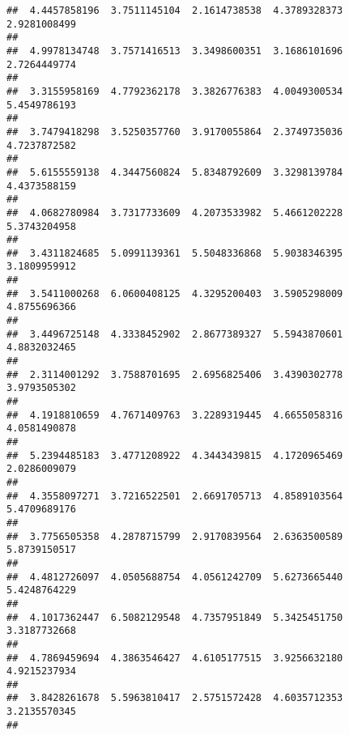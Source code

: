 \documentclass[]{article}
\begin{document}
\begin{verbatim}
##  4.4457858196  3.7511145104  2.1614738538  4.3789328373  2.9281008499 
##                                                                       
##  4.9978134748  3.7571416513  3.3498600351  3.1686101696  2.7264449774 
##                                                                       
##  3.3155958169  4.7792362178  3.3826776383  4.0049300534  5.4549786193 
##                                                                       
##  3.7479418298  3.5250357760  3.9170055864  2.3749735036  4.7237872582 
##                                                                       
##  5.6155559138  4.3447560824  5.8348792609  3.3298139784  4.4373588159 
##                                                                       
##  4.0682780984  3.7317733609  4.2073533982  5.4661202228  5.3743204958 
##                                                                       
##  3.4311824685  5.0991139361  5.5048336868  5.9038346395  3.1809959912 
##                                                                       
##  3.5411000268  6.0600408125  4.3295200403  3.5905298009  4.8755696366 
##                                                                       
##  3.4496725148  4.3338452902  2.8677389327  5.5943870601  4.8832032465 
##                                                                       
##  2.3114001292  3.7588701695  2.6956825406  3.4390302778  3.9793505302 
##                                                                       
##  4.1918810659  4.7671409763  3.2289319445  4.6655058316  4.0581490878 
##                                                                       
##  5.2394485183  3.4771208922  4.3443439815  4.1720965469  2.0286009079 
##                                                                       
##  4.3558097271  3.7216522501  2.6691705713  4.8589103564  5.4709689176 
##                                                                       
##  3.7756505358  4.2878715799  2.9170839564  2.6363500589  5.8739150517 
##                                                                       
##  4.4812726097  4.0505688754  4.0561242709  5.6273665440  5.4248764229 
##                                                                       
##  4.1017362447  6.5082129548  4.7357951849  5.3425451750  3.3187732668 
##                                                                       
##  4.7869459694  4.3863546427  4.6105177515  3.9256632180  4.9215237934 
##                                                                       
##  3.8428261678  5.5963810417  2.5751572428  4.6035712353  3.2135570345 
##                                                                       

\end{verbatim}
\end{document}
